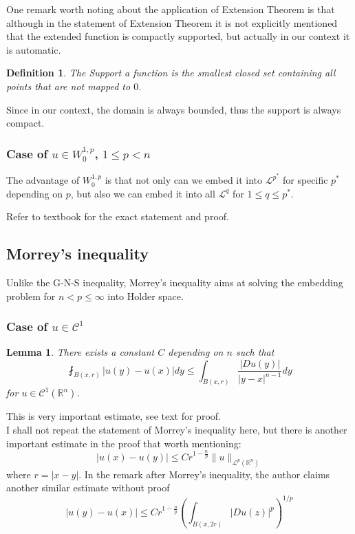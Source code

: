 \documentclass{article}
\begin{document}
One remark worth noting about the application of Extension Theorem is that although in the statement of Extension Theorem it is not explicitly mentioned that the extended function is compactly supported, but actually in our context it is automatic. 

\newtheorem{Def}{Definition}[section]
\begin{Def}
    The Support a function is the smallest closed set containing all points that are not mapped to $0$.
\end{Def}

Since in our context, the domain is always bounded, thus the support is always compact.

\subsubsection{Case of $u\in W^{1,p}_{0}$, $1\leq p< n$}

\indent\indent The advantage of $W^{1,p}_0$ is that not only can we embed it into $\mathscr{L}^{p^*}$ for specific $p^*$ depending on $p$, but also we can embed it into all $\mathscr{L}^{q}$ for $1\leq q\leq p^*$.

Refer to textbook for the exact statement and proof.

\subsection{Morrey's inequality}

\indent\indent Unlike the G-N-S inequality, Morrey's inequality aims at solving the embedding problem for $n<p\leq \infty$ into Holder space.

\subsubsection{Case of $u\in \mathscr{C}^{1}$}

\newtheorem{Lem}{Lemma}
\begin{Lem}
    There exists a constant $C$ depending on $n$ such that 
    $$
    \fint_{B(x,r)}|u(y)-u(x)|dy\leq\int_{B(x,r)}\frac{|Du(y)|}{|y-x|^{n-1}}dy
    $$
    for $u\in\mathscr{C}^1(\mathbb{R}^n)$.
\end{Lem} 

This is very important estimate, see text for proof. \\

I shall not repeat the statement of Morrey's inequality here, but there is another important estimate in the proof that worth mentioning:
$$
    |u(x)-u(y)|\leq Cr^{1-\frac{n}{p}}\|u\|_{\mathscr{L}^p(\mathbb{R}^n)}
$$ where $r=|x-y|$. In the remark after Morrey's inequality, the author claims another similar estimate without proof
$$
    |u(y)-u(x)|\leq Cr^{1-\frac{n}{p}}\left(\int_{B(x,2r)}|Du(z)|^p\right)^{1/p}
$$
\end{document}
